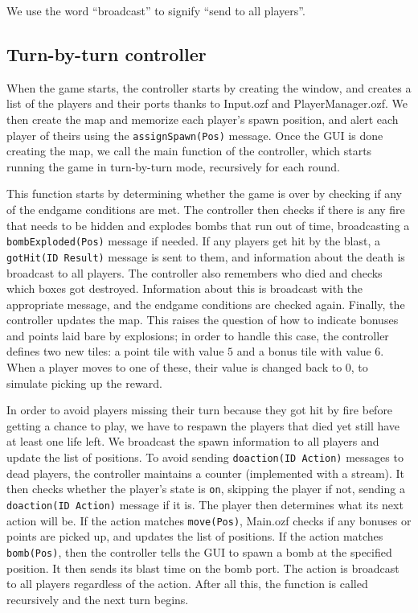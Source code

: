 \documentclass[12pt,journal]{IEEEtran}
\newcommand{\ntt}{\normalfont\ttfamily}
\newcommand{\fn}[1]{{\protect\ntt#1}}
\begin{document}
We use the word ``broadcast'' to signify ``send to all players''.

\subsection{Turn-by-turn controller}
When the game starts, the controller starts by creating the window, and creates a list of the players and their ports thanks to \fn{Input.ozf} and \fn{PlayerManager.ozf}.
We then create the map and memorize each player's spawn position, and alert each player of theirs using the \lstinline|assignSpawn(Pos)| message.
Once the GUI is done creating the map, we call the main function of the controller, which starts running the game in turn-by-turn mode, recursively for each round.

This function starts by determining whether the game is over by checking if any of the endgame conditions are met.
The controller then checks if there is any fire that needs to be hidden and explodes bombs that run out of time, broadcasting a \lstinline|bombExploded(Pos)| message if needed.
If any players get hit by the blast, a \lstinline|gotHit(ID Result)| message is sent to them, and information about the death is broadcast to all players.
The controller also remembers who died and checks which boxes got destroyed.
Information about this is broadcast with the appropriate message,
and the endgame conditions are checked again.
Finally, the controller updates the map.
This raises the question of how to indicate bonuses and points laid bare by explosions; in order to handle this case, the controller defines two new tiles: a point tile with value \(5\) and a bonus tile with value \(6\).
When a player moves to one of these, their value is changed back to \(0\), to simulate picking up the reward.

In order to avoid players missing their turn because they got hit by fire before getting a chance to play, we have to respawn the players that died yet still have at least one life left.
We broadcast the spawn information to all players and update the list of positions.
To avoid sending \lstinline|doaction(ID Action)| messages to dead players, the controller maintains a counter (implemented with a stream).
It then checks whether the player's state is \lstinline|on|, skipping the player if not, sending a \lstinline|doaction(ID Action)| message if it is.
The player then determines what its next action will be.
If the action matches \lstinline|move(Pos)|, \fn{Main.ozf} checks if any bonuses or points are picked up, and updates the list of positions.
If the action matches \lstinline|bomb(Pos)|, then the controller tells the GUI to spawn a bomb at the specified position.
It then sends its blast time on the bomb port.
The action is broadcast to all players regardless of the action.
After all this, the function is called recursively and the next turn begins.
\end{document}
